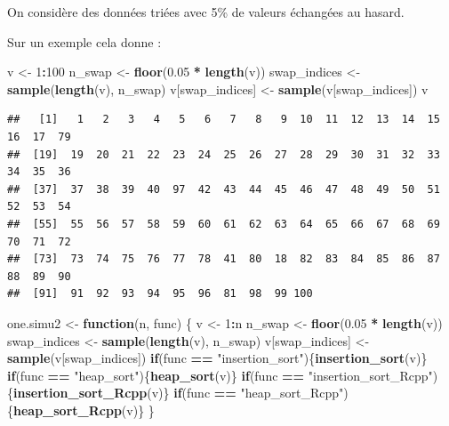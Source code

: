 \documentclass[
]{article}
\newenvironment{Shaded}{\begin{snugshade}}{\end{snugshade}}
\newcommand{\ControlFlowTok}[1]{\textcolor[rgb]{0.13,0.29,0.53}{\textbf{#1}}}
\newcommand{\DecValTok}[1]{\textcolor[rgb]{0.00,0.00,0.81}{#1}}
\newcommand{\FloatTok}[1]{\textcolor[rgb]{0.00,0.00,0.81}{#1}}
\newcommand{\FunctionTok}[1]{\textcolor[rgb]{0.13,0.29,0.53}{\textbf{#1}}}
\newcommand{\NormalTok}[1]{#1}
\newcommand{\OtherTok}[1]{\textcolor[rgb]{0.56,0.35,0.01}{#1}}
\newcommand{\SpecialCharTok}[1]{\textcolor[rgb]{0.81,0.36,0.00}{\textbf{#1}}}
\newcommand{\StringTok}[1]{\textcolor[rgb]{0.31,0.60,0.02}{#1}}
\begin{document}
On considère des données triées avec 5\% de valeurs échangées au hasard.

Sur un exemple cela donne :

\begin{Shaded}
\begin{Highlighting}[]
\NormalTok{v }\OtherTok{\textless{}{-}} \DecValTok{1}\SpecialCharTok{:}\DecValTok{100}
\NormalTok{n\_swap }\OtherTok{\textless{}{-}} \FunctionTok{floor}\NormalTok{(}\FloatTok{0.05} \SpecialCharTok{*} \FunctionTok{length}\NormalTok{(v))}
\NormalTok{swap\_indices }\OtherTok{\textless{}{-}} \FunctionTok{sample}\NormalTok{(}\FunctionTok{length}\NormalTok{(v), n\_swap)}
\NormalTok{v[swap\_indices] }\OtherTok{\textless{}{-}} \FunctionTok{sample}\NormalTok{(v[swap\_indices])}
\NormalTok{v}
\end{Highlighting}
\end{Shaded}

\begin{verbatim}
##   [1]   1   2   3   4   5   6   7   8   9  10  11  12  13  14  15  16  17  79
##  [19]  19  20  21  22  23  24  25  26  27  28  29  30  31  32  33  34  35  36
##  [37]  37  38  39  40  97  42  43  44  45  46  47  48  49  50  51  52  53  54
##  [55]  55  56  57  58  59  60  61  62  63  64  65  66  67  68  69  70  71  72
##  [73]  73  74  75  76  77  78  41  80  18  82  83  84  85  86  87  88  89  90
##  [91]  91  92  93  94  95  96  81  98  99 100
\end{verbatim}

\begin{Shaded}
\begin{Highlighting}[]
\NormalTok{one.simu2 }\OtherTok{\textless{}{-}} \ControlFlowTok{function}\NormalTok{(n, func)}
\NormalTok{\{}
\NormalTok{  v }\OtherTok{\textless{}{-}} \DecValTok{1}\SpecialCharTok{:}\NormalTok{n}
\NormalTok{  n\_swap }\OtherTok{\textless{}{-}} \FunctionTok{floor}\NormalTok{(}\FloatTok{0.05} \SpecialCharTok{*} \FunctionTok{length}\NormalTok{(v))}
\NormalTok{  swap\_indices }\OtherTok{\textless{}{-}} \FunctionTok{sample}\NormalTok{(}\FunctionTok{length}\NormalTok{(v), n\_swap)}
\NormalTok{  v[swap\_indices] }\OtherTok{\textless{}{-}} \FunctionTok{sample}\NormalTok{(v[swap\_indices])}
  \ControlFlowTok{if}\NormalTok{(func }\SpecialCharTok{==} \StringTok{"insertion\_sort"}\NormalTok{)\{}\FunctionTok{insertion\_sort}\NormalTok{(v)\}}
  \ControlFlowTok{if}\NormalTok{(func }\SpecialCharTok{==} \StringTok{"heap\_sort"}\NormalTok{)\{}\FunctionTok{heap\_sort}\NormalTok{(v)\} }
  \ControlFlowTok{if}\NormalTok{(func }\SpecialCharTok{==} \StringTok{"insertion\_sort\_Rcpp"}\NormalTok{)\{}\FunctionTok{insertion\_sort\_Rcpp}\NormalTok{(v)\}}
  \ControlFlowTok{if}\NormalTok{(func }\SpecialCharTok{==} \StringTok{"heap\_sort\_Rcpp"}\NormalTok{)\{}\FunctionTok{heap\_sort\_Rcpp}\NormalTok{(v)\}}
\NormalTok{\}}
\end{Highlighting}
\end{Shaded}
\end{document}

